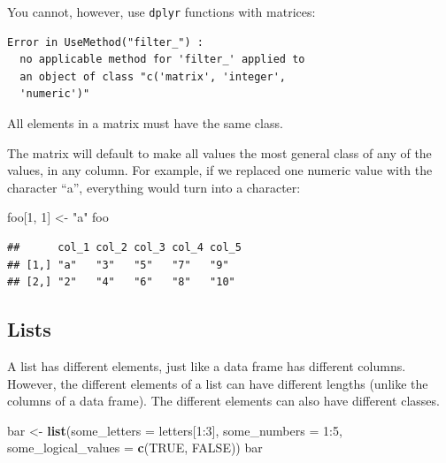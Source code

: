 \documentclass[]{book}
\makeatletter
\newenvironment{Shaded}{\begin{snugshade}}{\end{snugshade}}
\newcommand{\KeywordTok}[1]{\textcolor[rgb]{0.13,0.29,0.53}{\textbf{{#1}}}}
\newcommand{\DataTypeTok}[1]{\textcolor[rgb]{0.13,0.29,0.53}{{#1}}}
\newcommand{\DecValTok}[1]{\textcolor[rgb]{0.00,0.00,0.81}{{#1}}}
\newcommand{\StringTok}[1]{\textcolor[rgb]{0.31,0.60,0.02}{{#1}}}
\newcommand{\OtherTok}[1]{\textcolor[rgb]{0.56,0.35,0.01}{{#1}}}
\newcommand{\NormalTok}[1]{{#1}}
\newenvironment{kframe}{%
\medskip{}
\setlength{\fboxsep}{.8em}
 \def\at@end@of@kframe{}%
 \ifinner\ifhmode%
  \def\at@end@of@kframe{\end{minipage}}%
  \begin{minipage}{\columnwidth}%
 \fi\fi%
 \def\FrameCommand##1{\hskip\@totalleftmargin \hskip-\fboxsep
 \colorbox{shadecolor}{##1}\hskip-\fboxsep
     \hskip-\linewidth \hskip-\@totalleftmargin \hskip\columnwidth}%
 \MakeFramed {\advance\hsize-\width
   \@totalleftmargin\z@ \linewidth\hsize
   \@setminipage}}%
 {\par\unskip\endMakeFramed%
 \at@end@of@kframe}
\renewenvironment{Shaded}{\begin{kframe}}{\end{kframe}}
\makeatother
\begin{document}
You cannot, however, use \texttt{dplyr} functions with matrices:

\begin{Shaded}
\end{Shaded}

\begin{verbatim}
Error in UseMethod("filter_") : 
  no applicable method for 'filter_' applied to
  an object of class "c('matrix', 'integer',
  'numeric')"
\end{verbatim}

All elements in a matrix must have the same class. \bigskip

The matrix will default to make all values the most general class of any
of the values, in any column. For example, if we replaced one numeric
value with the character ``a'', everything would turn into a character:

\begin{Shaded}
\begin{Highlighting}[]
\NormalTok{foo[}\DecValTok{1}\NormalTok{, }\DecValTok{1}\NormalTok{] <-}\StringTok{ "a"}
\NormalTok{foo}
\end{Highlighting}
\end{Shaded}

\begin{verbatim}
##      col_1 col_2 col_3 col_4 col_5
## [1,] "a"   "3"   "5"   "7"   "9"  
## [2,] "2"   "4"   "6"   "8"   "10"
\end{verbatim}

\subsection{Lists}\label{lists}

A list has different elements, just like a data frame has different
columns. However, the different elements of a list can have different
lengths (unlike the columns of a data frame). The different elements can
also have different classes.

\begin{Shaded}
\begin{Highlighting}[]
\NormalTok{bar <-}\StringTok{ }\KeywordTok{list}\NormalTok{(}\DataTypeTok{some_letters =} \NormalTok{letters[}\DecValTok{1}\NormalTok{:}\DecValTok{3}\NormalTok{],}
            \DataTypeTok{some_numbers =} \DecValTok{1}\NormalTok{:}\DecValTok{5}\NormalTok{, }
            \DataTypeTok{some_logical_values =} \KeywordTok{c}\NormalTok{(}\OtherTok{TRUE}\NormalTok{, }\OtherTok{FALSE}\NormalTok{))}
\NormalTok{bar}
\end{Highlighting}
\end{Shaded}
\end{document}
